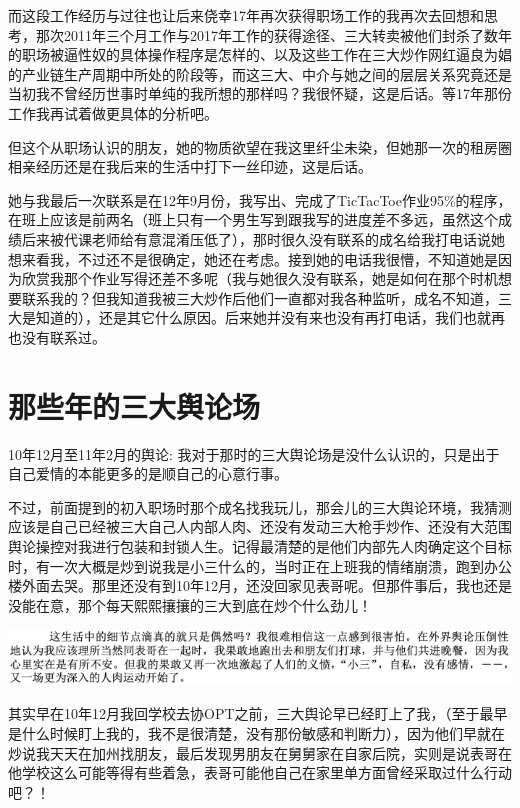 \documentclass[9pt, b5paper]{article}
\begin{document}
而这段工作经历与过往也让后来侥幸17年再次获得职场工作的我再次去回想和思考，那次2011年三个月工作与2017年工作的获得途径、三大转卖被他们封杀了数年的职场被逼性奴的具体操作程序是怎样的、以及这些工作在三大炒作网红逼良为娼的产业链生产周期中所处的阶段等，而这三大、中介与她之间的层层关系究竟还是当初我不曾经历世事时单纯的我所想的那样吗？我很怀疑，这是后话。等17年那份工作我再试着做更具体的分析吧。 

但这个从职场认识的朋友，她的物质欲望在我这里纤尘未染，但她那一次的租房圈相亲经历还是在我后来的生活中打下一丝印迹，这是后话。 

她与我最后一次联系是在12年9月份，我写出、完成了TicTacToe作业95\%的程序，在班上应该是前两名（班上只有一个男生写到跟我写的进度差不多远，虽然这个成绩后来被代课老师给有意混淆压低了），那时很久没有联系的成名给我打电话说她想来看我，不过还不是很确定，她还在考虑。接到她的电话我很懵，不知道她是因为欣赏我那个作业写得还差不多呢（我与她很久没有联系，她是如何在那个时机想要联系我的？但我知道我被三大炒作后他们一直都对我各种监听，成名不知道，三大是知道的），还是其它什么原因。后来她并没有来也没有再打电话，我们也就再也没有联系过。 

\section{那些年的三大舆论场}
\label{sec:org7a05a74}

10年12月至11年2月的舆论: 我对于那时的三大舆论场是没什么认识的，只是出于自己爱情的本能更多的是顺自己的心意行事。 

不过，前面提到的初入职场时那个成名找我玩儿，那会儿的三大舆论环境，我猜测应该是自己已经被三大自己人内部人肉、还没有发动三大枪手炒作、还没有大范围舆论操控对我进行包装和封锁人生。记得最清楚的是他们内部先人肉确定这个目标时，有一次大概是炒到说我是小三什么的，当时正在上班我的情绪崩溃，跑到办公楼外面去哭。那里还没有到10年12月，还没回家见表哥呢。但那件事后，我也还是没能在意，那个每天熙熙攘攘的三大到底在炒个什么劲儿！

\begin{center}
\includegraphics[width=.9\linewidth]{./pic/p1p46-2.png}
\end{center}

其实早在10年12月我回学校去协OPT之前，三大舆论早已经盯上了我，（至于最早是什么时候盯上我的，我不是很清楚，没有那份敏感和判断力），因为他们早就在炒说我天天在加州找朋友，最后发现男朋友在舅舅家在自家后院，实则是说表哥在他学校这么可能等得有些着急，表哥可能他自己在家里单方面曾经采取过什么行动吧？！ 
\end{document}
